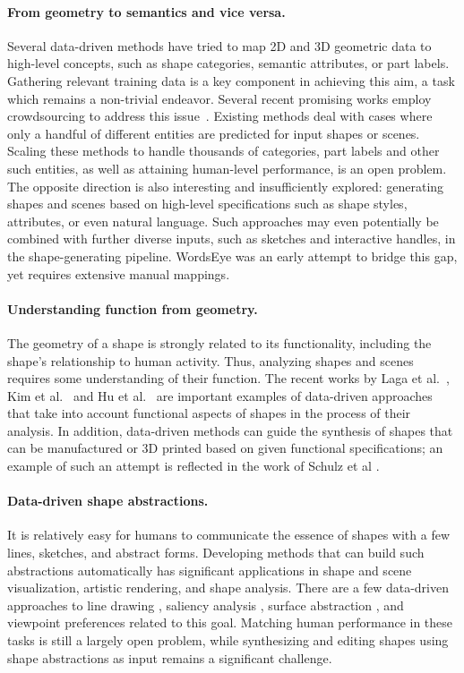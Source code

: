 \paragraph*{From geometry to semantics and vice versa.}
Several data-driven methods have tried to map 2D and 3D geometric data to high-level concepts, such as shape categories, semantic attributes, or part labels.
Gathering relevant training data is a key component in achieving this aim, a task which remains a non-trivial endeavor.  Several recent promising works employ crowdsourcing to address this issue~\cite{Chen:2009:BMS,Chaudhuri:2013:ACC,lun:style:2015,liu:style:2015,Yumer:2015:SSE}.  Existing methods deal with cases where only a handful of different entities are predicted for input shapes or scenes.
Scaling these methods to handle thousands of categories, part labels and other such entities, as well as attaining human-level performance, is an open problem.
The opposite direction is also interesting and insufficiently explored: generating shapes and scenes based on high-level specifications such as shape styles, attributes, or even natural language.  Such approaches may even potentially be combined with further diverse inputs, such as sketches and interactive handles, in the shape-generating pipeline. WordsEye \cite{Coyne:2001:WAT} was an early attempt to bridge this gap, yet requires extensive manual mappings.

\paragraph*{Understanding function from geometry.}
The geometry of a shape is strongly related to its functionality, including the shape's relationship to human activity. Thus, analyzing shapes and scenes requires some understanding of their function. The recent works by Laga et al.~\cite{Laga:2013:GCS}, Kim et al.~\cite{Kim14} and Hu et al.~\cite{hu:icon:2015,hu:icon2:2016} are important
examples of data-driven approaches that take into account functional aspects of shapes in the process of their analysis.
In addition, data-driven methods can guide the synthesis of shapes that can be manufactured or 3D printed based on given functional specifications; an example of such an attempt is reflected in the work of Schulz et al \cite{Schulz:2014:DFE}.


\paragraph*{Data-driven shape abstractions.}
It is relatively easy for humans to communicate the essence of shapes with a few lines, sketches, and abstract forms. Developing methods that can build such abstractions automatically has significant applications in shape and scene visualization, artistic rendering, and shape analysis. There are a few data-driven approaches to line drawing \cite{Cole:2008:WDP,Kalogerakis:2009:DDC,Kalogerakis:2012:LHP}, saliency analysis \cite{Chen:2012:SPO}, surface abstraction \cite{Yumer:2012:CSC}, and viewpoint preferences \cite{Secord:2011:PMO} related to this goal. Matching human performance in these tasks is still a largely open problem, while synthesizing and editing shapes using shape abstractions as input remains a significant challenge.


